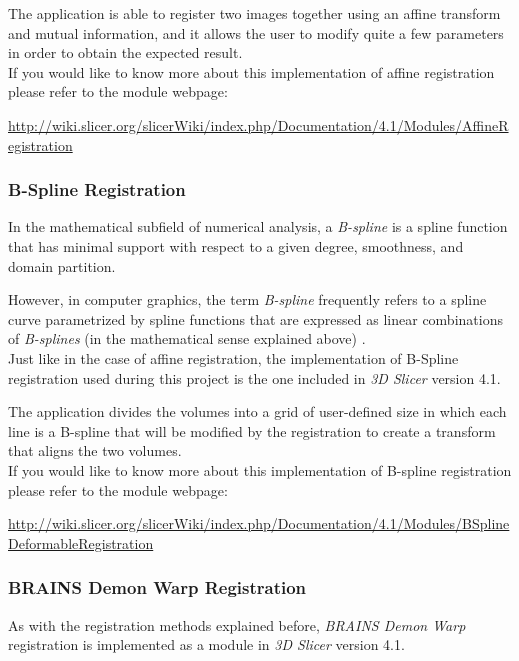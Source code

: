 The application is able to register two images together using an
affine transform and mutual information, and it allows the user to
modify quite a few parameters
in order to obtain the expected result.\\

If you would like to know more about this implementation of affine
registration please refer to the module webpage:

\url{http://wiki.slicer.org/slicerWiki/index.php/Documentation/4.1/Modules/AffineRegistration}

\subsubsection{B-Spline Registration}
In the mathematical subfield of numerical analysis, a
\textit{B-spline} is a spline function that has minimal support with
respect to a given degree, smoothness, and domain partition.

However, in computer graphics, the term \textit{B-spline} frequently
refers to a spline curve parametrized by spline functions that are
expressed as linear combinations of \textit{B-splines} (in the
mathematical sense explained above) \cite{bspline}.\\

Just like in the case of affine registration, the implementation of
B-Spline registration used during this project is the one included in
\textit{3D Slicer} version 4.1. 

The application divides the volumes into a grid of user-defined size
in which each line is a B-spline that will be modified by the
registration to create a transform that aligns the two volumes.\\

If you would like to know more about this implementation of B-spline
registration please refer to the module webpage:

\url{http://wiki.slicer.org/slicerWiki/index.php/Documentation/4.1/Modules/BSplineDeformableRegistration}


\subsubsection{BRAINS Demon Warp Registration}
\label{sec:demon_warp}
As with the registration methods explained before, \textit{BRAINS
  Demon Warp} registration is implemented as a module in \textit{3D
  Slicer} version 4.1.\\

